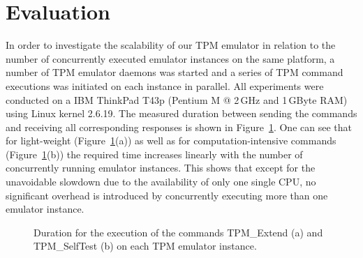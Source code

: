 \documentclass[11pt,letterpaper]{article}
\begin{document}
\section{Evaluation}
In order to investigate the scalability of our TPM emulator in relation to the number of
concurrently executed emulator instances on the same platform, a number of TPM emulator daemons was
started and a series of TPM command executions was initiated on each instance in parallel. All
experiments were conducted on a IBM ThinkPad T43p (Pentium M @ 2\,GHz and 1\,GByte RAM) using Linux
kernel 2.6.19. The measured duration between sending the commands and receiving all corresponding
responses is shown in Figure~\ref{plot:execution_time}. One can see that for light-weight
(Figure~\ref{plot:execution_time}(a)) as well as for computation-intensive commands
(Figure~\ref{plot:execution_time}(b)) the required time increases linearly with the number of
concurrently running emulator instances. This shows that except for the unavoidable slowdown due
to the availability of only one single CPU, no significant overhead is introduced by concurrently
executing more than one emulator instance.

\begin{figure}[h]
\centering
{}\quad%
\vspace*{-3mm}
\caption{Duration for the execution of the commands TPM\_Extend (a) and TPM\_SelfTest (b) on each
TPM emulator instance.}
\label{plot:execution_time}
\end{figure}
\end{document}
